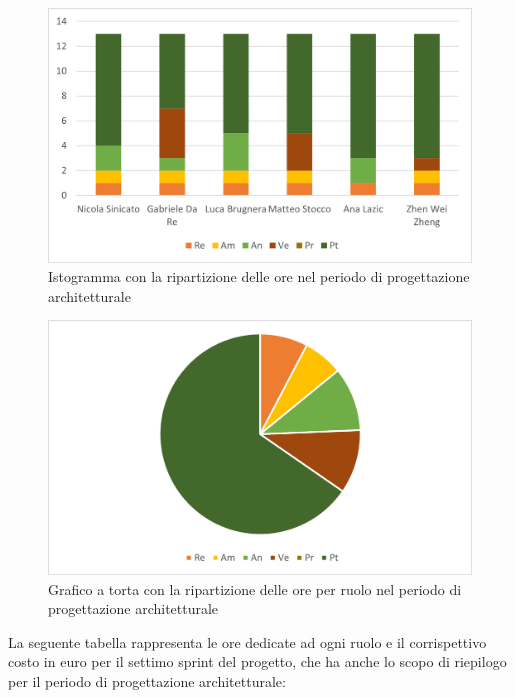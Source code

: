 	\begin{figure}[H]
		\centering
		\includegraphics[scale=0.6]{img/grafi preventivo/istogrammi/architetturale/complessivo.png}
		\caption{Istogramma con la ripartizione delle ore nel periodo di progettazione architetturale}
	\end{figure}
	\begin{figure}[H]
		\centering
		\includegraphics[scale=0.6]{img/grafi preventivo/torta/architetturale/complessivo.png}
		\caption{Grafico a torta con la ripartizione delle ore per ruolo nel periodo di progettazione architetturale}
	\end{figure}
	La seguente tabella rappresenta le ore dedicate ad ogni ruolo e il corrispettivo costo in euro per il settimo sprint del progetto, che ha anche lo scopo di riepilogo per il periodo di progettazione architetturale:
	
